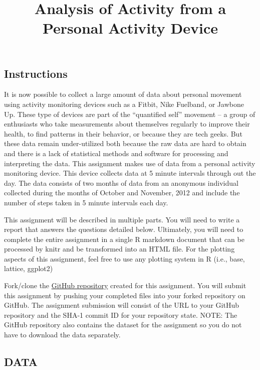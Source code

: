 \documentclass[
]{article}
\title{Analysis of Activity from a Personal Activity Device}
\author{}
\date{\vspace{-2.5em}}
\begin{document}
\maketitle

\hypertarget{instructions}{%
\subsection{Instructions}\label{instructions}}

It is now possible to collect a large amount of data about personal
movement using activity monitoring devices such as a Fitbit, Nike
Fuelband, or Jawbone Up. These type of devices are part of the
``quantified self'' movement -- a group of enthusiasts who take
measurements about themselves regularly to improve their health, to find
patterns in their behavior, or because they are tech geeks. But these
data remain under-utilized both because the raw data are hard to obtain
and there is a lack of statistical methods and software for processing
and interpreting the data. This assignment makes use of data from a
personal activity monitoring device. This device collects data at 5
minute intervals through out the day. The data consists of two months of
data from an anonymous individual collected during the months of October
and November, 2012 and include the number of steps taken in 5 minute
intervals each day.

This assignment will be described in multiple parts. You will need to
write a report that answers the questions detailed below. Ultimately,
you will need to complete the entire assignment in a single R markdown
document that can be processed by knitr and be transformed into an HTML
file. For the plotting aspects of this assignment, feel free to use any
plotting system in R (i.e., base, lattice, ggplot2)

Fork/clone the
\href{http://github.com/rdpeng/RepData_PeerAssessment1}{GitHub
repository} created for this assignment. You will submit this assignment
by pushing your completed files into your forked repository on GitHub.
The assignment submission will consist of the URL to your GitHub
repository and the SHA-1 commit ID for your repository state. NOTE: The
GitHub repository also contains the dataset for the assignment so you do
not have to download the data separately.

\hypertarget{data}{%
\subsection{DATA}\label{data}}
\end{document}
